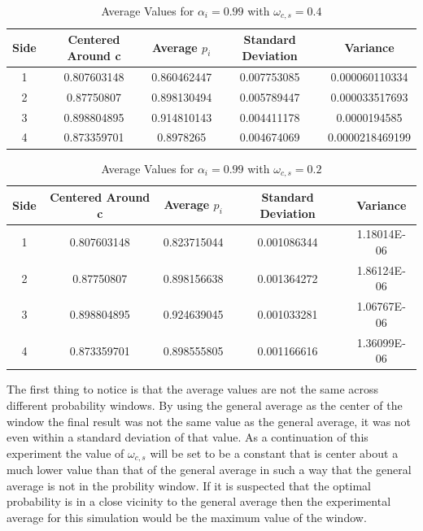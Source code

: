 \documentclass{article}
\begin{document}
\begin{table}[h!]
\centering
\caption{Average Values for $\alpha_i = 0.99$ with $\omega_{c,s} = 0.4$}
\label{tab:table1}
\begin{tabular}{|c|c|c|c|c|}
\hline
Side  & Centered Around c & Average $p_i$ & Standard Deviation & Variance\\
\hline
1 & 0.807603148 & 0.860462447 & 0.007753085 & 0.000060110334\\
2 & 0.87750807 & 0.898130494 & 0.005789447 & 0.000033517693\\
3 & 0.898804895 & 0.914810143 & 0.004411178 & 0.0000194585\\
4 & 0.873359701 & 0.8978265 & 0.004674069 & 0.0000218469199\\
\hline
\end{tabular}
\end{table}

\begin{table}[h!]
\centering
\caption{Average Values for $\alpha_i = 0.99$ with $\omega_{c,s} = 0.2$}
\label{tab:table1}
\begin{tabular}{|c|c|c|c|c|}
\hline
Side  & Centered Around c & Average $p_i$ & Standard Deviation & Variance\\
\hline
1 & 0.807603148 & 0.823715044 & 0.001086344 & 1.18014E-06\\
2 & 0.87750807 & 0.898156638 & 0.001364272 & 1.86124E-06\\
3 & 0.898804895 & 0.924639045 & 0.001033281 & 1.06767E-06\\
4 & 0.873359701 & 0.898555805 & 0.001166616 & 1.36099E-06\\
\hline
\end{tabular}
\end{table}

The first thing to notice is that the average values are not the same across different probability windows.  By using the general average as the center of the window the final result was not the same value as the general average, it was not even within a standard deviation of that value.  As a continuation of this experiment the value of $\omega_{c,s}$ will be set to be a constant that is center about a much lower value than that of the general average in such a way that the general average is not in the probility window.  If it is suspected that the optimal probability is in a close vicinity to the general average then the experimental average for this simulation would be the maximum value of the window.
\end{document}
